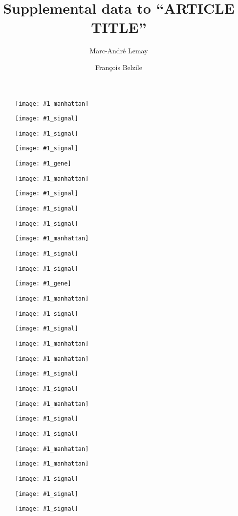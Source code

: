 \documentclass[12pt]{article}
\title{Supplemental data to ``ARTICLE TITLE''}
\author{Marc-André Lemay \and François Belzile}
\date{}
\newenvironment{cfigure}
	{\begin{figure} \centering}
	{\end{figure}}
\newcommand{\manhattanplot}[1]{
\begin{cfigure}
	\texttt{[image: \#1\_manhattan]}
	\caption[Figure caption]{}
	\label{#1_manhattan}
\end{cfigure}

\clearpage}
\newcommand{\signalplot}[1]{
\begin{cfigure}
	\texttt{[image: \#1\_signal]}
	\caption[Figure caption]{}
	\label{#1_signal}
\end{cfigure}

\clearpage}
\newcommand{\geneplot}[1]{
\begin{cfigure}
	\texttt{[image: \#1\_gene]}
	\caption[Figure caption]{}
	\label{#1_gene}
\end{cfigure}

\clearpage}
\begin{document}
\maketitle \thispagestyle{empty}

\tableofcontents

\vspace{4ex}

\listoftables

\thispagestyle{empty}

\vspace{4ex}

\listoffigures


\clearpage


%
%

\manhattanplot{stem_termination_all}
\signalplot{stem_termination_all_Dt2}
\signalplot{stem_termination_all_Dt1}
\signalplot{stem_termination_all_E3}
\geneplot{sda_dt1}

\manhattanplot{stem_termination_sn}
\signalplot{stem_termination_sn_Dt2}
\signalplot{stem_termination_sn_Dt1}
\signalplot{stem_termination_sn_E3}

\manhattanplot{pubescence_color_all}
\signalplot{pubescence_color_all_Td}
\signalplot{pubescence_color_all_T}
\geneplot{pca_t}

\manhattanplot{pubescence_color_nogray}
\signalplot{pubescence_color_nogray_Td}
\signalplot{pubescence_color_nogray_T}

\manhattanplot{protein}

\manhattanplot{pubescence_form_all}
\signalplot{pubescence_form_all_Pa1}
\signalplot{pubescence_form_all_Pa2}

\manhattanplot{pubescence_form_noerect}
\signalplot{pubescence_form_noerect_Pa1}
\signalplot{pubescence_form_noerect_Pa2}

\manhattanplot{oil}

\manhattanplot{pubescence_density}
\signalplot{pubescence_density_Pd1}
\signalplot{pubescence_density_Ps}
\signalplot{pubescence_density_P1}
\end{document}
